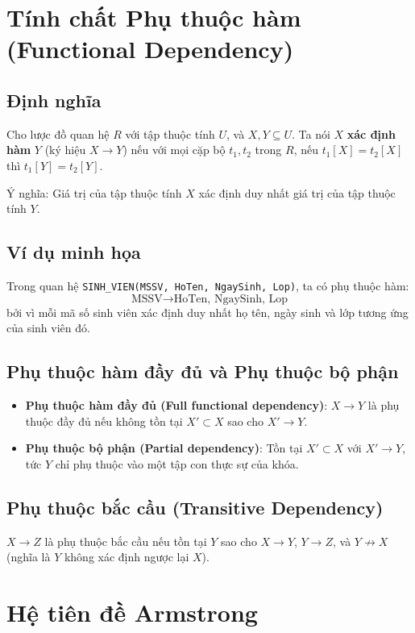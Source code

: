 \section{Tính chất Phụ thuộc hàm (Functional Dependency)}

\subsection{Định nghĩa}
Cho lược đồ quan hệ $R$ với tập thuộc tính $U$, và $X, Y \subseteq U$. Ta nói $X$ \textbf{xác định hàm} $Y$ (ký hiệu $X \rightarrow Y$) nếu với mọi cặp bộ $t_1, t_2$ trong $R$, nếu $t_1[X] = t_2[X]$ thì $t_1[Y] = t_2[Y]$.

Ý nghĩa: Giá trị của tập thuộc tính $X$ xác định duy nhất giá trị của tập thuộc tính $Y$.

\subsection{Ví dụ minh họa}
Trong quan hệ \texttt{SINH\_VIEN(MSSV, HoTen, NgaySinh, Lop)}, ta có phụ thuộc hàm:
$$\text{MSSV} \rightarrow \text{HoTen, NgaySinh, Lop}$$
bởi vì mỗi mã số sinh viên xác định duy nhất họ tên, ngày sinh và lớp tương ứng của sinh viên đó.

\subsection{Phụ thuộc hàm đầy đủ và Phụ thuộc bộ phận}
\begin{itemize}
    \item \textbf{Phụ thuộc hàm đầy đủ (Full functional dependency)}: $X \rightarrow Y$ là phụ thuộc đầy đủ nếu không tồn tại $X' \subset X$ sao cho $X' \rightarrow Y$.
    \item \textbf{Phụ thuộc bộ phận (Partial dependency)}: Tồn tại $X' \subset X$ với $X' \rightarrow Y$, tức $Y$ chỉ phụ thuộc vào một tập con thực sự của khóa.
\end{itemize}

\subsection{Phụ thuộc bắc cầu (Transitive Dependency)}
$X \rightarrow Z$ là phụ thuộc bắc cầu nếu tồn tại $Y$ sao cho $X \rightarrow Y$, $Y \rightarrow Z$, và $Y \not\rightarrow X$ (nghĩa là $Y$ không xác định ngược lại $X$).

\section{Hệ tiên đề Armstrong}

